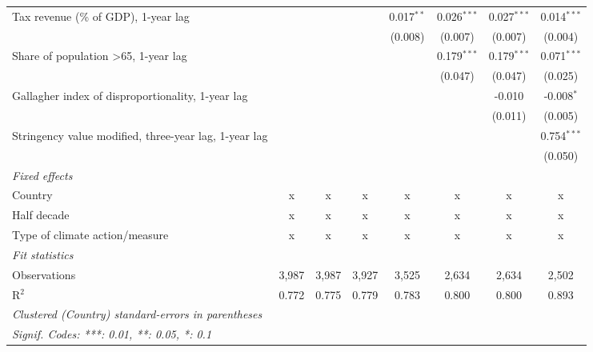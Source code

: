 \begin{tabular}{lccccccc}
   Tax revenue (\% of GDP), 1-year lag                               &         &         &              & 0.017$^{**}$  & 0.026$^{***}$  & 0.027$^{***}$  & 0.014$^{***}$\\   
                                                                     &         &         &              & (0.008)       & (0.007)        & (0.007)        & (0.004)\\   
   Share of population >65, 1-year lag                               &         &         &              &               & 0.179$^{***}$  & 0.179$^{***}$  & 0.071$^{***}$\\   
                                                                     &         &         &              &               & (0.047)        & (0.047)        & (0.025)\\   
   Gallagher index of disproportionality, 1-year lag                 &         &         &              &               &                & -0.010         & -0.008$^{*}$\\   
                                                                     &         &         &              &               &                & (0.011)        & (0.005)\\   
   Stringency value modified, three-year lag, 1-year lag             &         &         &              &               &                &                & 0.754$^{***}$\\   
                                                                     &         &         &              &               &                &                & (0.050)\\   
   \emph{Fixed effects}\\
   Country                                                           & x       & x       & x            & x             & x              & x              & x\\  
   Half decade                                                       & x       & x       & x            & x             & x              & x              & x\\  
   Type of climate action/measure                                    & x       & x       & x            & x             & x              & x              & x\\  
   \midrule \emph{Fit statistics}\\
   Observations                                                      & 3,987   & 3,987   & 3,927        & 3,525         & 2,634          & 2,634          & 2,502\\  
   R$^2$                                                             & 0.772   & 0.775   & 0.779        & 0.783         & 0.800          & 0.800          & 0.893\\  
   \midrule
   \multicolumn{8}{l}{\emph{Clustered (Country) standard-errors in parentheses}}\\
   \multicolumn{8}{l}{\emph{Signif. Codes: ***: 0.01, **: 0.05, *: 0.1}}\\
\end{tabular}
\par\endgroup


